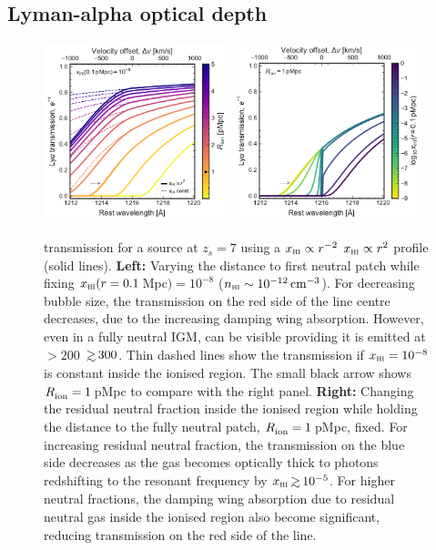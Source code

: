 \documentclass[fleqn,usenatbib]{mnras}
\providecommand{\DIFadd}[1]{{\protect\color{Green} \bf #1}} %
\providecommand{\DIFdel}[1]{{\protect\color{lightgray} \footnotesize \sout{#1}}} %
\providecommand{\DIFaddend}{} %
\providecommand{\DIFaddFL}[1]{\DIFadd{#1}} %
\providecommand{\DIFdelFL}[1]{\DIFdel{#1}} %
\providecommand{\DIFaddbeginFL}{} %
\providecommand{\DIFaddendFL}{} %
\providecommand{\DIFdelbeginFL}{} %
\providecommand{\DIFdelendFL}{} %
\newcommand{\DIFscaledelfig}{0.5}
\newlength{\DIFdelgraphicswidth} %
\newlength{\DIFdelgraphicsheight} %
\newcommand{\DIFaddincludegraphics}[2][]{{\color{blue}\fbox{\DIFOincludegraphics[#1]{#2}}}} %
\newcommand{\DIFdelincludegraphics}[2][]{%
\sbox{\DIFdelgraphicsbox}{\DIFOincludegraphics[#1]{#2}}%
\settoboxwidth{\DIFdelgraphicswidth}{\DIFdelgraphicsbox} %
\settoboxtotalheight{\DIFdelgraphicsheight}{\DIFdelgraphicsbox} %
\scalebox{\DIFscaledelfig}{%
\parbox[b]{\DIFdelgraphicswidth}{\usebox{\DIFdelgraphicsbox}\\[-\baselineskip] \rule{\DIFdelgraphicswidth}{0em}}\llap{\resizebox{\DIFdelgraphicswidth}{\DIFdelgraphicsheight}{%
\setlength{\unitlength}{\DIFdelgraphicswidth}%
\begin{picture}(1,1)%
\thicklines\linethickness{2pt} %
{\color[rgb]{1,0,0}\put(0,0){\framebox(1,1){}}}%
{\color[rgb]{1,0,0}\put(0,0){\line( 1,1){1}}}%
{\color[rgb]{1,0,0}\put(0,1){\line(1,-1){1}}}%
\end{picture}%
}\hspace*{3pt}}} %
} %
\DeclareRobustCommand{\DIFaddend}{\DIFOaddend \let\includegraphics\DIFOincludegraphics} %
\DeclareRobustCommand{\DIFaddbeginFL}{\DIFOaddbeginFL \let\includegraphics\DIFaddincludegraphics} %
\DeclareRobustCommand{\DIFaddendFL}{\DIFOaddendFL \let\includegraphics\DIFOincludegraphics} %
\DeclareRobustCommand{\DIFdelbeginFL}{\DIFOdelbeginFL \let\includegraphics\DIFdelincludegraphics} %
\DeclareRobustCommand{\DIFdelendFL}{\DIFOaddendFL \let\includegraphics\DIFOincludegraphics} %
\begin{document}
\DIFaddend %
\subsection{Lyman-alpha optical depth}
\label{sec:model_optdepth}

\begin{figure}
    \includegraphics[width=0.48\textwidth]{figs/fig1a.pdf}
    \includegraphics[width=0.49\textwidth]{figs/fig1b.pdf}
    \caption{\lya transmission for a source at $z_s=7$ using a \DIFdelbeginFL \DIFdelFL{$\xHI \propto r^{-2}$ }\DIFdelendFL \DIFaddbeginFL \DIFaddFL{$\xHI \propto r^{2}$ }\DIFaddendFL profile (solid lines). \textbf{Left:} Varying the distance to first neutral patch while fixing $\xHI(r=0.1\,$Mpc$) = 10^{-8}$ ($n_\HI \sim 10^{-12}\cm^{-3}$). For decreasing bubble size, the transmission on the red side of the \lya line centre decreases, due to the increasing damping wing absorption. However, even in a fully neutral IGM, \lya can be visible providing it is emitted at \DIFdelbeginFL \DIFdelFL{$>200$}\DIFdelendFL \DIFaddbeginFL \DIFaddFL{$\simgt300$}\DIFaddendFL \kms. Thin dashed lines show the transmission if $\xHI=10^{-8}$ is constant inside the ionised region. The small black arrow shows $\Rion=1\,$pMpc to compare with the right panel. \textbf{Right:} Changing the residual neutral fraction inside the ionised region while holding the distance to the fully neutral patch, $\Rion=1\,$pMpc, fixed. For increasing residual neutral fraction, the transmission on the blue side decreases as the gas becomes optically thick to \lya photons redshifting to the resonant frequency by $\xHI \simgt 10^{-5}$. For higher neutral fractions, the damping wing absorption due to residual neutral gas inside the ionised region also become significant, reducing transmission on the red side of the line.}
    \label{fig:lya_transmission}
\end{figure}
\end{document}
